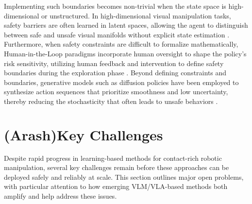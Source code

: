 \documentclass[Afour,sageh,times]{template/sagej}
\newcommand{\suggest}[1]{{\color{olive} (#1)}}
\begin{document}
Implementing such boundaries becomes non-trivial when the state space is high-dimensional or unstructured. In high-dimensional visual manipulation tasks, safety barriers are often learned in latent spaces, allowing the agent to distinguish between safe and unsafe visual manifolds without explicit state estimation \cite{65}. Furthermore, when safety constraints are difficult to formalize mathematically, Human-in-the-Loop paradigms incorporate human oversight to shape the policy's risk sensitivity, utilizing human feedback and intervention to define safety boundaries during the exploration phase \cite{54}. Beyond defining constraints and boundaries, generative models such as diffusion policies have been employed to synthesize action sequences that prioritize smoothness and low uncertainty, thereby reducing the stochasticity that often leads to unsafe behaviors \cite{42}.

    \section{\suggest{Arash}Key Challenges} \label{sec:challenges}
    Despite rapid progress in learning-based methods for contact-rich robotic manipulation, several key challenges remain before these approaches can be deployed safely and reliably at scale. This section outlines major open problems, with particular attention to how emerging VLM/VLA-based methods both amplify and help address these issues.
\end{document}
